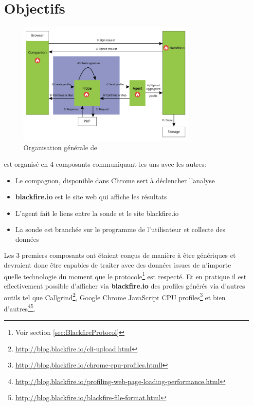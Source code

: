 
\chapter{Objectifs}
	\setcounter{chapter}{2}
	
\begin{figure}[!h]
\begin{center}
  \includegraphics[width=0.8\textwidth]{images/schemas/workflow/general-workflow}
  \caption{Organisation générale de \Blackfire}
\end{center}
\end{figure}

\Blackfire est organisé en 4 composants communiquant les uns avec les autres:
\begin{itemize}
\item Le compagnon, disponible dans Chrome sert à déclencher l'analyse
\item \textbf{blackfire.io} est le site web qui affiche les résultats
\item L'agent fait le liens entre la sonde et le site blackfire.io
\item La sonde est branchée sur le programme de l'utilisateur et collecte des données
\end{itemize}

Les 3 premiers composants ont étaient conçus de manière à être génériques et devraient donc être capables de traiter avec des données issues de n'importe quelle technologie du moment que le protocole\footnote{Voir section \vref{sec:BlackfireProtocol}} est respecté. Et en pratique il est effectivement possible d'afficher via \textbf{blackfire.io} des profiles générés via d'autres outils tel que Callgrind\footnote{\url{http://blog.blackfire.io/cli-upload.html}}, Google Chrome JavaScript CPU profiles\footnote{\url{http://blog.blackfire.io/chrome-cpu-profiles.htmll}} et bien d'autres\footnote{\url{http://blog.blackfire.io/profiling-web-page-loading-performance.html}}\footnote{\url{http://blog.blackfire.io/blackfire-file-format.html}}.

